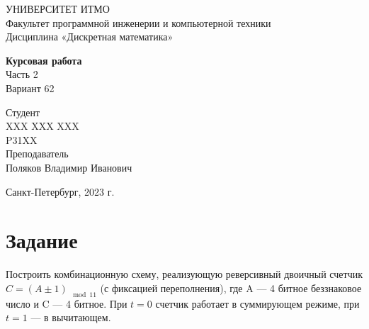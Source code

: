 \documentclass{article}
\begin{document}
\begin{center}
    УНИВЕРСИТЕТ ИТМО \\
    Факультет программной инженерии и компьютерной техники \\
    Дисциплина «Дискретная математика»
    
    \vspace{5cm}

    \large
    \textbf{Курсовая работа} \\
    Часть 2 \\
    Вариант 62
\end{center}

\vspace{2cm}

\hfill\begin{minipage}{0.35\linewidth}
Студент \\
XXX XXX XXX \\
P31XX \\

Преподаватель \\
Поляков Владимир Иванович
\end{minipage}

\vfill

\begin{center}
    Санкт-Петербург, 2023 г.
\end{center}

\thispagestyle{empty}
\newpage

\section*{Задание}
Построить комбинационную схему, реализующую реверсивный двоичный счетчик $C = (A \pm 1)_{\mod 11}$ (с фиксацией переполнения), где A --- 4 битное беззнаковое число и C --- 4 битное. При $t = 0$ счетчик работает в суммирующем режиме, при $t = 1$ --- в вычитающем.
\end{document}

